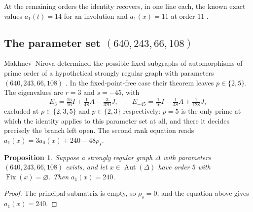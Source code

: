 \documentclass[11pt]{article}
\theoremstyle{plain}
\newtheorem{proposition}[theorem]{Proposition}
\theoremstyle{remark}
\newcommand{\Aut}{\operatorname{Aut}}
\newcommand{\Fix}{\operatorname{Fix}}
\begin{document}
At the remaining orders the identity recovers, in one line each,
the known exact values $a_1(t)=14$ for an involution and $a_1(x)=11$ at order $11$ \cite{MakhnevMinakova}.

\subsection{\texorpdfstring{The parameter set $(640,243,66,108)$}{The parameter set (640,243,66,108)}}\label{subsec:640}

Makhnev--Nirova determined the possible fixed subgraphs of automorphisms of prime order of a hypothetical strongly regular graph with parameters $(640,243,66,108)$ \cite{MakhnevNirova}.
In the fixed-point-free case their theorem leaves $p\in\{2,5\}$.
The eigenvalues are $r=3$ and $s=-45$, with
\[
 E_{3}=\tfrac{15}{16}I+\tfrac1{48}A-\tfrac3{320}J,
 \qquad
 E_{-45}=\tfrac1{16}I-\tfrac1{48}A+\tfrac1{128}J,
\]
excluded at $p\in\{2,3,5\}$ and $p\in\{2,3\}$ respectively:
$p=5$ is the only prime at which the identity applies to this parameter set at all,
and there it decides precisely the branch left open.
The second rank equation reads $a_1(x)=3a_0(x)+240-48\rho_s$.

\begin{proposition}\label{prop:640}
Suppose a strongly regular graph $\Delta$ with parameters $(640,243,66,108)$ exists,
and let $x\in\Aut(\Delta)$ have order $5$ with $\Fix(x)=\varnothing$.
Then $a_1(x)=240$.
\end{proposition}

\begin{proof}
The principal submatrix is empty, so $\rho_s=0$, and the equation above gives $a_1(x)=240$.
\end{proof}
\end{document}
